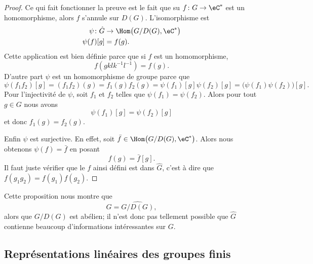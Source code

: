 \begin{proof}
    Ce qui fait fonctionner la preuve est le fait que su \( f\colon G\to \eC^*\) est un homomorphisme, alors \( f\) s'annule sur \( D(G)\). L'isomorphisme est
    \begin{equation}
        \begin{aligned}
            \psi\colon \hat G&\to \Hom\big( G/D(G),\eC^* \big) \\
            \psi(f)[g]&=f(g). 
        \end{aligned}
    \end{equation}
    Cette application est bien définie parce que si \( f\) est un homomorphisme,
    \begin{equation}
        f(gklk^{-1}l^{-1})=f(g).
    \end{equation}
    D'autre part \( \psi\) est un homomorphisme de groupe parce que
    \begin{equation}
        \psi(f_1f_2)[g]=(f_1f_2)(g)=f_1(g)f_2(g)=\psi(f_1)[g]\psi(f_2)[g]=\big( \psi(f_1)\psi(f_2) \big)[g].
    \end{equation}
    Pour l'injectivité de \( \psi\), soit \( f_1\) et \( f_2\) telles que \( \psi(f_1)=\psi(f_2)\). Alors pour tout \( g\in G\) nous avons
    \begin{equation}
        \psi(f_1)[g]=\psi(f_2)[g]
    \end{equation}
    et donc \( f_1(g)=f_2(g)\).

    Enfin \( \psi\) est surjective. En effet, soit \( \bar f\in\Hom\big( G/D(G),\eC^* \big)\). Alors nous obtenons \( \psi(f)=\bar f\) en posant
    \begin{equation}
        f(g)=\bar f[g].
    \end{equation}
    Il faut juste vérifier que le \( f\) ainsi défini est dans \( \hat G\), c'est à dire que \( f(g_1g_2)=f(g_1)f(g_2)\).
\end{proof}

Cette proposition nous montre que
\begin{equation}
    \hat G=\widehat{G/D(G)},
\end{equation}
alors que \( G/D(G)\) est abélien; il n'est donc pas tellement possible que \( \hat G\) contienne beaucoup d'informations intéressantes sur \( G\).

\subsection{Représentations linéaires des groupes finis}

